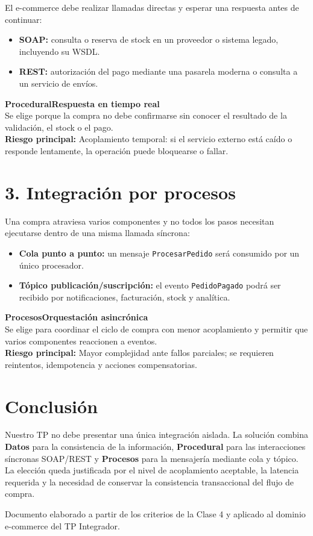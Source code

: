\documentclass[10pt,a4paper]{article}
\newcommand{\typebox}[4]{%
  \vspace{1pt}
  \noindent\colorbox{soft}{%
    \parbox{0.965\linewidth}{%
      \textbf{\color{primary}\large #1}\hfill\textbf{\color{accent}#2}\\[2pt]
      #3\\[2pt]
      \textbf{\color{risk}Riesgo principal:} #4
    }%
  }
  \vspace{1pt}
}
\begin{document}
El e-commerce debe realizar llamadas directas y esperar una respuesta antes de continuar:

\begin{itemize}
  \item \textbf{SOAP:} consulta o reserva de stock en un proveedor o sistema legado, incluyendo su WSDL.
  \item \textbf{REST:} autorización del pago mediante una pasarela moderna o consulta a un servicio de envíos.
\end{itemize}

\typebox{Procedural}{Respuesta en tiempo real}{Se elige porque la compra no debe confirmarse sin conocer el resultado de la validación, el stock o el pago.}{Acoplamiento temporal: si el servicio externo está caído o responde lentamente, la operación puede bloquearse o fallar.}

\section*{3. Integración por procesos}

Una compra atraviesa varios componentes y no todos los pasos necesitan ejecutarse dentro de una misma llamada síncrona:

\begin{center}
\end{center}

\begin{itemize}
  \item \textbf{Cola punto a punto:} un mensaje \texttt{ProcesarPedido} será consumido por un único procesador.
  \item \textbf{Tópico publicación/suscripción:} el evento \texttt{PedidoPagado} podrá ser recibido por notificaciones, facturación, stock y analítica.
\end{itemize}

\typebox{Procesos}{Orquestación asincrónica}{Se elige para coordinar el ciclo de compra con menor acoplamiento y permitir que varios componentes reaccionen a eventos.}{Mayor complejidad ante fallos parciales; se requieren reintentos, idempotencia y acciones compensatorias.}

\section*{Conclusión}

Nuestro TP no debe presentar una única integración aislada. La solución combina \textbf{Datos} para la consistencia de la información, \textbf{Procedural} para las interacciones síncronas SOAP/REST y \textbf{Procesos} para la mensajería mediante cola y tópico. La elección queda justificada por el nivel de acoplamiento aceptable, la latencia requerida y la necesidad de conservar la consistencia transaccional del flujo de compra.

\vfill
{\footnotesize\color{textgray}
Documento elaborado a partir de los criterios de la Clase 4 y aplicado al dominio e-commerce del TP Integrador.}
\end{document}
